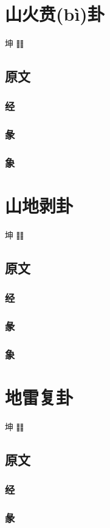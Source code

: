 \documentclass[12pt,oneside]{book}
\begin{document}
\chapter{山火贲(bì)卦}
坤 ䷁

\section{原文}
\subsection{经}
\subsection{彖}
\subsection{象}


\chapter{山地剥卦}
坤 ䷁

\section{原文}
\subsection{经}
\subsection{彖}
\subsection{象}


\chapter{地雷复卦}
坤 ䷁

\section{原文}
\subsection{经}
\subsection{彖}
\end{document}

